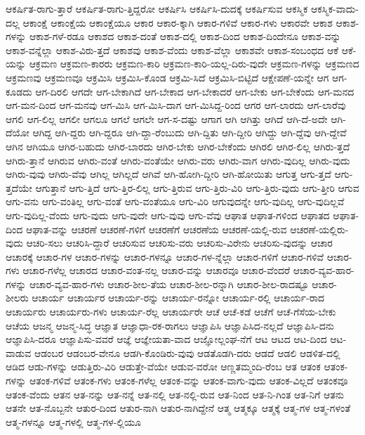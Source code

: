 {ಆಕರ್ಷಿತ-ರಾಗು-ತ್ತಾರೆ
ಆಕರ್ಷಿತ-ರಾಗು-ತ್ತಿದ್ದರೋ
ಆಕರ್ಷಿಸಿ
ಆಕರ್ಷಿಸಿ-ದುದಕ್ಕೆ
ಆಕರ್ಷಿಸುವ
ಆಕಸ್ಮಿಕ
ಆಕಸ್ಮಿಕ-ವಾದು-ದಲ್ಲ
ಆಕಾಂಕ್ಷೆ
ಆಕಾಂಕ್ಷೆಯ
ಆಕಾಂಕ್ಷೆಯೂ
ಆಕಾರ
ಆಕಾರ-ಕ್ಕಾಗಿ
ಆಕಾರ-ಗಳಿವೆ
ಆಕಾರ-ಗಳು
ಆಕಾರವೇ
ಆಕಾಶ
ಆಕಾಶ-ಗಳನ್ನು
ಆಕಾಶ-ಗಳೆ-ರಡೂ
ಆಕಾಶದ
ಆಕಾಶ-ದಂತೆ
ಆಕಾಶ-ದಲ್ಲಿ
ಆಕಾಶ-ದಿಂದ
ಆಕಾಶ-ದಿಂದೇನೂ
ಆಕಾಶ-ವನ್ನು
ಆಕಾಶ-ವನ್ನೆಲ್ಲಾ
ಆಕಾಶ-ವಿರು-ತ್ತದೆ
ಆಕಾಶವು
ಆಕಾಶ-ವೆಂದು
ಆಕಾಶ-ವೆಲ್ಲಾ
ಆಕಾಶವೇ
ಆಕಾಶ-ಸಂಬಂಧದ
ಆಕೆ
ಆಕೆ-ಯನ್ನು
ಆಕ್ರಮಣ
ಆಕ್ರಮಣ-ಕಾರರು
ಆಕ್ರಮಣ-ಕಾರಿ
ಆಕ್ರಮಣ-ಕಾರಿ-ಯಲ್ಲ-ದಿರು-ವುದೇ
ಆಕ್ರಮಣ-ಗಳನ್ನು
ಆಕ್ರಮಣದ
ಆಕ್ರಮಣವು
ಆಕ್ರಮಣವೂ
ಆಕ್ರಮಿಸಿ
ಆಕ್ರಮಿಸಿ-ಕೊಂಡ
ಆಕ್ರಮಿ-ಸಿದೆ
ಆಕ್ರಮಿಸಿ-ಬಿಟ್ಟಿದೆ
ಆಕ್ಷೇಪಣೆ-ಯನ್ನೇ
ಆಗ
ಆಗ-ಕೂಡದು
ಆಗ-ದಿರಲಿ
ಆಗದೇ
ಆಗ-ಬೇಕಾಗಿದೆ
ಆಗ-ಬೇಕಾದ
ಆಗ-ಬೇಕಾದರೆ
ಆಗ-ಬೇಕು
ಆಗ-ಬೇಕೆಂದು
ಆಗ-ಮನದ
ಆಗ-ಮನ-ದಿಂದ
ಆಗ-ಮನವು
ಆಗ-ಮಿಸಿ
ಆಗ-ಮಿಸಿ-ದಾಗ
ಆಗ-ಮಿಸಿದ್ದ-ರಿಂದ
ಆಗರ
ಆಗ-ಲಾರದು
ಆಗ-ಲಾರೆವು
ಆಗಲಿ
ಆಗ-ಲಿಲ್ಲ
ಆಗಲೀ
ಆಗಲೂ
ಆಗಲೆ
ಆಗಲೇ
ಆಗ-ಸ-ದಷ್ಟು
ಆಗಾಗ
ಆಗಿ
ಆಗಿತ್ತು
ಆಗಿದೆ
ಆಗಿ-ದೆ-ಅದೇ
ಆಗಿ-ದೆಯೋ
ಆಗಿದ್ದ
ಆಗಿ-ದ್ದರು
ಆಗಿ-ದ್ದರೂ
ಆಗಿ-ದ್ದಾ-ರೆಂಬುದು
ಆಗಿ-ದ್ದಿತು
ಆಗಿ-ದ್ದೀರಿ
ಆಗಿದ್ದು
ಆಗಿ-ದ್ದೆವು
ಆಗಿ-ದ್ದೇವೆ
ಆಗಿನ
ಆಗಿಯೂ
ಆಗಿರ-ಬಹುದು
ಆಗಿರ-ಬಾರದು
ಆಗಿರ-ಬೇಕು
ಆಗಿರ-ಬೇಕೆಂದು
ಆಗಿರಲಿ
ಆಗಿರ-ಲಿಲ್ಲ
ಆಗಿರು-ತ್ತದೆ
ಆಗಿರು-ತ್ತಾನೆ
ಆಗಿರುವ
ಆಗಿರು-ವಂತೆ
ಆಗಿರು-ವಂತೆಯೇ
ಆಗಿರು-ವರು
ಆಗಿರು-ವಾಗ
ಆಗಿರು-ವುದಿಲ್ಲ
ಆಗಿರು-ವುದು
ಆಗಿರು-ವುವು
ಆಗಿರು-ವೆವು
ಆಗಿಲ್ಲ
ಆಗಿಲ್ಲದೆ
ಆಗಿವೆ
ಆಗಿ-ಹೋಗಿ-ದ್ದೀರಿ
ಆಗಿ-ಹೋಯಿತು
ಆಗುತ್ತ
ಆಗು-ತ್ತದೆ
ಆಗು-ತ್ತದೆಯೇ
ಆಗುತ್ತಾನೆ
ಆಗು-ತ್ತಿದೆ
ಆಗು-ತ್ತಿರ-ಲಿಲ್ಲ
ಆಗು-ತ್ತಿರುವ
ಆಗು-ತ್ತಿರು-ವಿರಿ
ಆಗು-ತ್ತಿರು-ವುದು
ಆಗು-ತ್ತೀರಿ
ಆಗುವ
ಆಗು-ವನು
ಆಗು-ವಂತಿಲ್ಲ
ಆಗು-ವಂತೆ
ಆಗು-ವಂತೆಯೂ
ಆಗು-ವಿರಿ
ಆಗುವುದನ್ನೇ
ಆಗು-ವುದಿಲ್ಲ
ಆಗು-ವುದಿಲ್ಲವೆ
ಆಗು-ವುದಿಲ್ಲ-ವೆಂದು
ಆಗು-ವುದು
ಆಗು-ವುದೇ
ಆಗು-ವುವು
ಆಗು-ವೆವು
ಆಘಾತ
ಆಘಾತ-ಗಳಿಂದ
ಆಘಾತದ
ಆಘಾತ-ದಿಂದ
ಆಘಾತ-ವನ್ನು
ಆಚರಣೆ
ಆಚರಣೆ-ಗಳಿಗೆ
ಆಚರಣೆಗೆ
ಆಚರಣೆಯ
ಆಚರಣೆ-ಯಲ್ಲಿ-ರುವ
ಆಚರಣೆ-ಯಲ್ಲಿರು-ವುದು
ಆಚರಿ-ಸಲು
ಆಚರಿಸಿ-ದ್ದಾರೆ
ಆಚರಿಸುವ
ಆಚರಿಸು-ವರು
ಆಚರಿಸು-ವಿರೇನು
ಆಚರಿಸು-ವುದನ್ನು
ಆಚಾರ
ಆಚಾರಕ್ಕೆ
ಆಚಾರ-ಗಳ
ಆಚಾರ-ಗಳನ್ನು
ಆಚಾರ-ಗಳನ್ನೂ
ಆಚಾರ-ಗಳ-ನ್ನೆಲ್ಲಾ
ಆಚಾರ-ಗಳಿಗೆ
ಆಚಾರ-ಗಳಿವೆ
ಆಚಾರ-ಗಳು
ಆಚಾರ-ಗಳೆಲ್ಲ
ಆಚಾರದ
ಆಚಾರ-ವಂತ-ನಲ್ಲ
ಆಚಾರ-ವನ್ನು
ಆಚಾರವೂ
ಆಚಾರ-ವೆಂದರೆ
ಆಚಾರ-ವ್ಯವ-ಹಾರ-ಗಳನ್ನು
ಆಚಾರ-ವ್ಯವ-ಹಾರ-ಗಳು
ಆಚಾರ-ಶೀಲ-ತೆಯ
ಆಚಾರ-ಶೀಲ-ರನ್ನಾಗಿ
ಆಚಾರ-ಶೀಲ-ರಾದಷ್ಟೂ
ಆಚಾರ-ಶೀಲರು
ಆಚಾರ್ಯ
ಆಚಾರ್ಯರ
ಆಚಾರ್ಯ-ರನ್ನು
ಆಚಾರ್ಯ-ರನ್ನೋ
ಆಚಾರ್ಯ-ರಲ್ಲಿ
ಆಚಾರ್ಯ-ರಾದ
ಆಚಾರ್ಯರು
ಆಚಾರ್ಯರು-ಗಳು
ಆಚಾರ್ಯ-ರೆಲ್ಲ
ಆಚಾರ್ಯರೇ
ಆಚೆ
ಆಚೆ-ಕಡೆ
ಆಚೆಗೆ
ಆಚೆ-ಗೆಸೆಯ-ಬೇಕು
ಆಚೆಯ
ಆಜನ್ಮ
ಆಜನ್ಮ-ಸಿದ್ಧ
ಆಜ್ಞಾತ
ಆಜ್ಞಾಧಾ-ರಕ-ರಾಗಲು
ಆಜ್ಞಾಪಿಸಿ
ಆಜ್ಞಾಪಿಸಿದ-ನಲ್ಲದೆ
ಆಜ್ಞಾಪಿಸಿ-ದನು
ಆಜ್ಞಾಪಿಸಿ-ದರೂ
ಆಜ್ಞಾಪಿಸು-ವವರೆ
ಆಜ್ಞೆ
ಆಜ್ಞೇಯತಾ-ವಾದ
ಆಜ್ಞೋಲ್ಲಂಘ-ನೆಗೆ
ಆಟ
ಆಟದ
ಆಟ-ದಿಂದ
ಆಟ-ವಾಡುವ
ಆಡಂಬರ
ಆಡಂಬರ-ವೇನೂ
ಆಡಗಿ-ಕೊಂಡಿರು-ವುವು
ಆಡತೊಡಗಿ-ದರು
ಆಡದೆ
ಆಡಲಿ
ಆಡಳಿತ-ದಲ್ಲಿ
ಆಡಿದ
ಆಡು-ಗಳನ್ನು
ಆಡುತ್ತಿರು-ವಿರಿ
ಆಡುತ್ತೇ-ವೆಯೇ
ಆಡುವ-ವರೋ
ಆಣ್ಣತಮ್ಮಂದಿ-ರೆಂಬ
ಆತ
ಆತಂಕ
ಆತಂಕ-ಗಳನ್ನು
ಆತಂಕ-ಗಳಿವೆ
ಆತಂಕ-ಗಳು
ಆತಂಕ-ಗಳೆಲ್ಲ
ಆತಂಕ-ವನ್ನು
ಆತಂಕ-ವಾಗು-ವುದು
ಆತಂಕ-ವಿಲ್ಲದೆ
ಆತಂಕವೂ
ಆತಂಕ-ವೆಂದು
ಆತನ
ಆತ-ನನ್ನು
ಆತ-ನನ್ನೆ
ಆತ-ನಲ್ಲಿ
ಆತ-ನಲ್ಲಿ-ರುವ
ಆತ-ನಿಂದ
ಆತ-ನಿ-ಗಿಂತ
ಆತ-ನಿಗೆ
ಆತನು
ಆತನೇ
ಆತ-ನೊಬ್ಬನೇ
ಆತುರ-ದಿಂದ
ಆತುರ-ನಾಗಿ
ಆತುರ-ನಾಗಿದ್ದೇನೆ
ಆತ್ಮ
ಆತ್ಮಕ್ಕೂ
ಆತ್ಮಕ್ಕೆ
ಆತ್ಮ-ಗಳ
ಆತ್ಮ-ಗಳಂತೆ
ಆತ್ಮ-ಗಳನ್ನೂ
ಆತ್ಮ-ಗಳಲ್ಲಿ
ಆತ್ಮ-ಗಳ-ಲ್ಲಿಯೂ
}
